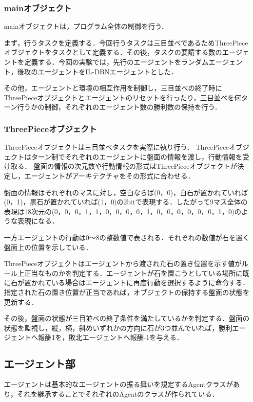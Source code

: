 \subsubsection{mainオブジェクト}
mainオブジェクトは，プログラム全体の制御を行う．

まず，行うタスクを定義する．今回行うタスクは三目並べであるためThreePieceオブジェクトをタスクとして定義する．その後，タスクの要請する数のエージェントを定義する．今回の実験では，先行のエージェントをランダムエージェント，後攻のエージェントをIL-DBNエージェントとした．

その他，エージェントと環境の相互作用を制御し，三目並べの終了時にThreePieceオブジェクトとエージェントのリセットを行ったり，三目並べを何ターン行うかの制御，それぞれのエージェント数の勝利数の保持を行う．

\subsubsection{ThreePieceオブジェクト}
ThreePieceオブジェクトは三目並べタスクを実際に執り行う．
ThreePieceオブジェクトはターン制でそれぞれのエージェントに盤面の情報を渡し，行動情報を受け取る．
盤面の情報の次元数や行動情報の形式はThreePieceオブジェクトが決定し，エージェントがアーキテクチャをその形式に合わせる．

盤面の情報はそれぞれのマスに対し，空白ならば(0，0)，白石が置かれていれば(0，1)，黒石が置かれていれば(1，0)の2bitで表現する．したがって9マス全体の表現は18次元の(0，0，0，1，1，0，0，0，0，1，0，0，0，0，0，0，1，0)のような表現になる．

一方エージェントの行動は0〜8の整数値で表される．それぞれの数値が石を置く盤面上の位置を示している．


ThreePieceオブジェクトはエージェントから渡された石の置き位置を示す値がルール上正当なものかを判定する．エージェントが石を置こうとしている場所に既に石が置かれている場合はエージェントに再度行動を選択するように命令する．指定された石の置き位置が正当であれば，オブジェクトの保持する盤面の状態を更新する．

その後，盤面の状態が三目並べの終了条件を満たしているかを判定する．盤面の状態を監視し，縦，横，斜めいずれかの方向に石が3つ並んでいれば，勝利エージェントへ報酬1を，敗北エージェントへ報酬-1を与える．

\subsection{エージェント部}
エージェントは基本的なエージェントの振る舞いを規定するAgentクラスがあり，それを継承することでそれぞれのAgentのクラスが作られている．

